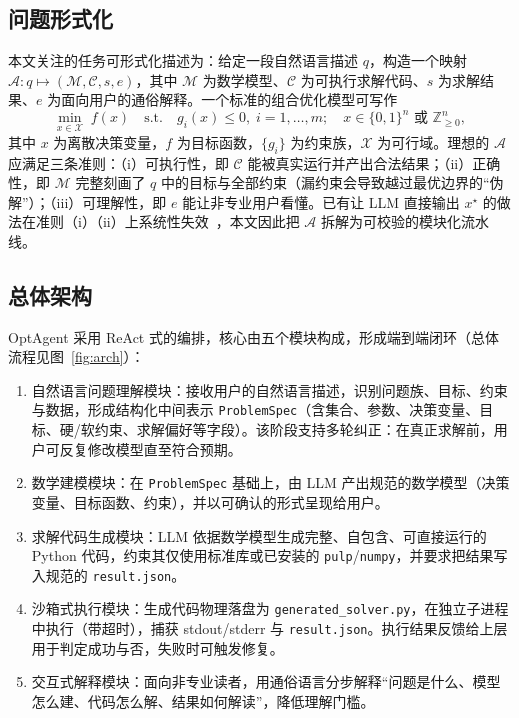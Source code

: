 \documentclass[11pt]{article}
\begin{document}
\subsection{问题形式化}
本文关注的任务可形式化描述为：给定一段自然语言描述 $q$，构造一个映射 $\mathcal{A}: q \mapsto (\mathcal{M}, \mathcal{C}, s, e)$，其中 $\mathcal{M}$ 为数学模型、$\mathcal{C}$ 为可执行求解代码、$s$ 为求解结果、$e$ 为面向用户的通俗解释。一个标准的组合优化模型可写作
\begin{equation}
\min_{x \in \mathcal{X}} \; f(x) \quad \text{s.t.} \quad g_i(x) \le 0,\; i=1,\dots,m;\quad x \in \{0,1\}^n \text{ 或 } \mathbb{Z}_{\ge 0}^n,
\end{equation}
其中 $x$ 为离散决策变量，$f$ 为目标函数，$\{g_i\}$ 为约束族，$\mathcal{X}$ 为可行域。理想的 $\mathcal{A}$ 应满足三条准则：（i）可执行性，即 $\mathcal{C}$ 能被真实运行并产出合法结果；（ii）正确性，即 $\mathcal{M}$ 完整刻画了 $q$ 中的目标与全部约束（漏约束会导致越过最优边界的“伪解”）；（iii）可理解性，即 $e$ 能让非专业用户看懂。已有让 LLM 直接输出 $x^\star$ 的做法在准则（i）（ii）上系统性失效~\cite{jiang2025nlco}，本文因此把 $\mathcal{A}$ 拆解为可校验的模块化流水线。

\subsection{总体架构}
OptAgent 采用 ReAct 式的编排，核心由五个模块构成，形成端到端闭环（总体流程见图~\ref{fig:arch}）：

\begin{enumerate}
  \item 自然语言问题理解模块：接收用户的自然语言描述，识别问题族、目标、约束与数据，形成结构化中间表示 \texttt{ProblemSpec}（含集合、参数、决策变量、目标、硬/软约束、求解偏好等字段）。该阶段支持多轮纠正：在真正求解前，用户可反复修改模型直至符合预期。
  \item 数学建模模块：在 \texttt{ProblemSpec} 基础上，由 LLM 产出规范的数学模型（决策变量、目标函数、约束），并以可确认的形式呈现给用户。
  \item 求解代码生成模块：LLM 依据数学模型生成完整、自包含、可直接运行的 Python 代码，约束其仅使用标准库或已安装的 \texttt{pulp}/\texttt{numpy}，并要求把结果写入规范的 \texttt{result.json}。
  \item 沙箱式执行模块：生成代码物理落盘为 \texttt{generated\_solver.py}，在独立子进程中执行（带超时），捕获 stdout/stderr 与 \texttt{result.json}。执行结果反馈给上层用于判定成功与否，失败时可触发修复。
  \item 交互式解释模块：面向非专业读者，用通俗语言分步解释“问题是什么、模型怎么建、代码怎么解、结果如何解读”，降低理解门槛。
\end{enumerate}
\end{document}
